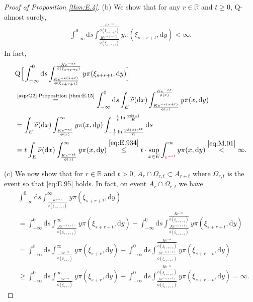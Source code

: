 \documentclass[12pt,a4paper]{amsart}
\numberwithin{equation}{section}
\theoremstyle{plain}
\theoremstyle{definition}
\theoremstyle{remark}
\begin{document}
\begin{proof}[Proof of Proposition \ref{thm:E.4}]
(b) We show that
	for any $r\in \mathbb R$ and $t\geq 0$, $\mathrm Q$-almost surely,
\begin{align}
\label{eq:E.95}
	\int_{-\infty}^0 \mathrm ds \int_{\frac{Ke^{-\epsilon (s+t)}}{\phi(\xi_{s+r+t})}}^\frac{Ke^{-\epsilon s}}{\phi(\xi_{s+r+t})} y\pi(\xi_{s+r+t},\mathrm dy)
	< \infty.
\end{align}
	In fact,
\begin{align}
	&\mathrm Q\Big[ \int_{-\infty}^0 \mathrm ds \int_{\frac{Ke^{-\epsilon (s+t)}}{\phi(\xi_{s+r+t})}}^\frac{Ke^{-\epsilon s}}{\phi(\xi_{s+r+t})} y\pi(\xi_{s+r+t},\mathrm dy) \Big]
	\\&\overset{\text{\eqref{asp:Q2},Proposition \ref{thm:E.15}}} = \int_{-\infty}^0 \mathrm ds \int_E \widetilde \nu(\mathrm dx) \int^{\frac{Ke^{-\epsilon s}}{\phi(x)}}_\frac{Ke^{-\epsilon (s+t)}}{\phi(x)} y\pi(x,\mathrm dy)
	\\&= \int_E \widetilde \nu(\mathrm dx) \int^\infty_\frac{Ke^{-\epsilon t}}{\phi(x)} y\pi(x,\mathrm dy) \int_{-\frac{1}{\epsilon}\ln \frac{y\phi(x) e^{\epsilon t}}{K}}^{-\frac{1}{\epsilon}\ln\frac{y\phi(x)}{K}} \mathrm ds
	\\&= t\int_E \widetilde \nu(\mathrm dx) \int^\infty_\frac{Ke^{-\epsilon t}}{\phi(x)} y\pi(x,\mathrm dy)
	\overset{\eqref{eq:E.934}}\leq t \cdot \sup_{x\in E} \int^\infty_{\color{red}{e^{-\epsilon t}}} y\pi(x,\mathrm dy)
	\overset{\eqref{eq:M.01}}< \infty.
\end{align}

(c) We now show that
	for $r\in \mathbb R$ and $t> 0$, $A_r \cap \Omega_{r,t} \subset A_{r+t}$ where $\Omega_{r,t}$ is the event so that \eqref{eq:E.95} holds.
	In fact,  on event $A_r\cap \Omega_{r,t}$ we have
\begin{align}
	&\int_{-\infty}^0 \mathrm ds \int_{\frac{K e^{-\epsilon s}}{\phi(\xi_{s+r+t})}}^\infty y\pi(\xi_{s+r+t},\mathrm dy)
	\\&= \int_{-\infty}^0 \mathrm ds \int_{\frac{K e^{-\epsilon (s+t)}}{\phi(\xi_{s+r+t})}}^\infty y\pi(\xi_{s+r+t},\mathrm dy) - \int_{-\infty}^0 \mathrm ds \int_{\frac{Ke^{-\epsilon (s+t)}}{\phi(\xi_{s+r+t})}}^\frac{Ke^{-\epsilon s}}{\phi(\xi_{s+r+t})} y\pi(\xi_{s+r+t},\mathrm dy)
	\\&= \int_{-\infty}^t \mathrm ds \int_{\frac{Ke^{-\epsilon s}}{\phi(\xi_{s+r})}}^\infty y\pi(\xi_{s+r},\mathrm dy) -  \int_{-\infty}^0 \mathrm ds \int_{\frac{Ke^{-\epsilon (s+t)}}{\phi(\xi_{s+r+t})}}^\frac{Ke^{-\epsilon s}}{\phi(\xi_{s+r+t})} y\pi(\xi_{s+r+t},\mathrm dy)
	\\&\geq \int_{-\infty}^0 \mathrm ds \int_{\frac{Ke^{-\epsilon s}}{\phi(\xi_{s+r})}}^\infty y\pi(\xi_{s+r},\mathrm dy) -  \int_{-\infty}^0 \mathrm ds \int_{\frac{Ke^{-\epsilon (s+t)}}{\phi(\xi_{s+r+t})}}^\frac{Ke^{-\epsilon s}}{\phi(\xi_{s+r+t})} y\pi(\xi_{s+r+t},\mathrm dy)
	= \infty.
\end{align}


\end{proof}
\end{document}
